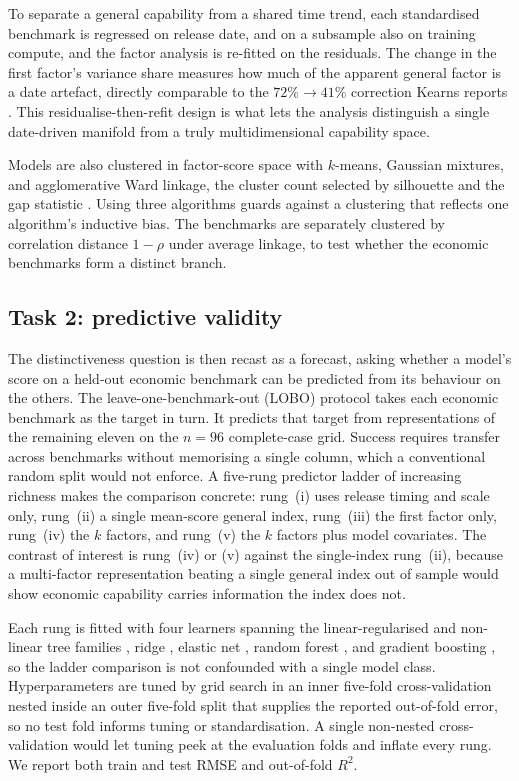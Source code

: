 To separate a general capability from a shared time trend, each standardised benchmark is
regressed on release date, and on a subsample also on training compute, and the factor analysis is
re-fitted on the residuals. The change in the first factor's variance share measures how much of the
apparent general factor is a date artefact, directly comparable to the $72\%\rightarrow41\%$ correction
Kearns reports \cite{kearns2026}. This residualise-then-refit design is what lets the analysis
distinguish a single date-driven manifold from a truly multidimensional capability space.

Models are also clustered in factor-score space with $k$-means, Gaussian mixtures, and agglomerative
Ward linkage, the cluster count selected by silhouette \cite{rousseeuw1987} and the gap statistic
\cite{tibshirani2001gap}. Using three algorithms guards against a clustering that reflects one
algorithm's inductive bias. The benchmarks are separately clustered by correlation distance $1-\rho$
under average linkage, to test whether the economic benchmarks form a distinct branch.

\subsection{Task 2: predictive validity}\label{sec:task2}
The distinctiveness question is then recast as a forecast, asking whether a model's score on a held-out
economic benchmark can be predicted from its behaviour on the others. The leave-one-benchmark-out (LOBO) protocol takes each economic benchmark as the target in turn. It predicts that target from representations of the remaining eleven on the $n=96$ complete-case grid. Success requires transfer across benchmarks without memorising a single column, which a conventional random split would not enforce. A five-rung
predictor ladder of increasing richness makes the comparison concrete: rung~(i) uses release timing and
scale only, rung~(ii) a single mean-score general index, rung~(iii) the first factor only, rung~(iv) the
$k$ factors, and rung~(v) the $k$ factors plus model covariates. The contrast of interest is
rung~(iv) or (v) against the single-index rung~(ii), because a multi-factor representation beating a
single general index out of sample would show economic capability carries information the index does not.

Each rung is fitted with four learners spanning the linear-regularised and non-linear tree families
\cite{hastie2009}, ridge \cite{hoerl1970}, elastic net \cite{zou2005}, random forest \cite{breiman2001},
and gradient boosting \cite{friedman2001}, so the ladder comparison is not confounded with a single
model class. Hyperparameters are tuned by grid search in an inner five-fold cross-validation nested
inside an outer five-fold split that supplies the reported out-of-fold error, so no test fold informs
tuning or standardisation. A single non-nested cross-validation would let tuning peek at the evaluation
folds and inflate every rung. We report both train and test RMSE and out-of-fold $R^2$.

